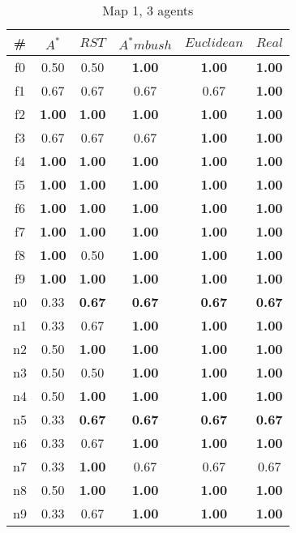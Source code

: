 \begin{table}[h]
\caption{Map 1, 3 agents}
\begin{center}

\begin{tabular}{|c|c|c|c|c|c|}
\hline
\# & $A^*$ & $RST$ & $A^*mbush$ & $Euclidean$ & $Real$\\
\hline
f0 & 0.50 & 0.50 & \textbf{1.00} & \textbf{1.00} & \textbf{1.00}\\
f1 & 0.67 & 0.67 & 0.67 & 0.67 & \textbf{1.00}\\
f2 & \textbf{1.00} & \textbf{1.00} & \textbf{1.00} & \textbf{1.00} & \textbf{1.00}\\
f3 & 0.67 & 0.67 & 0.67 & \textbf{1.00} & \textbf{1.00}\\
f4 & \textbf{1.00} & \textbf{1.00} & \textbf{1.00} & \textbf{1.00} & \textbf{1.00}\\
f5 & \textbf{1.00} & \textbf{1.00} & \textbf{1.00} & \textbf{1.00} & \textbf{1.00}\\
f6 & \textbf{1.00} & \textbf{1.00} & \textbf{1.00} & \textbf{1.00} & \textbf{1.00}\\
f7 & \textbf{1.00} & \textbf{1.00} & \textbf{1.00} & \textbf{1.00} & \textbf{1.00}\\
f8 & \textbf{1.00} & 0.50 & \textbf{1.00} & \textbf{1.00} & \textbf{1.00}\\
f9 & \textbf{1.00} & \textbf{1.00} & \textbf{1.00} & \textbf{1.00} & \textbf{1.00}\\
\hline
n0 & 0.33 & \textbf{0.67} & \textbf{0.67} & \textbf{0.67} & \textbf{0.67}\\
n1 & 0.33 & 0.67 & \textbf{1.00} & \textbf{1.00} & \textbf{1.00}\\
n2 & 0.50 & \textbf{1.00} & \textbf{1.00} & \textbf{1.00} & \textbf{1.00}\\
n3 & 0.50 & 0.50 & \textbf{1.00} & \textbf{1.00} & \textbf{1.00}\\
n4 & 0.50 & \textbf{1.00} & \textbf{1.00} & \textbf{1.00} & \textbf{1.00}\\
n5 & 0.33 & \textbf{0.67} & \textbf{0.67} & \textbf{0.67} & \textbf{0.67}\\
n6 & 0.33 & 0.67 & \textbf{1.00} & \textbf{1.00} & \textbf{1.00}\\
n7 & 0.33 & \textbf{1.00} & 0.67 & 0.67 & 0.67\\
n8 & 0.50 & \textbf{1.00} & \textbf{1.00} & \textbf{1.00} & \textbf{1.00}\\
n9 & 0.33 & 0.67 & \textbf{1.00} & \textbf{1.00} & \textbf{1.00}\\
\hline
\end{tabular}

\label{tab:exp1}
\end{center}
\end{table}
